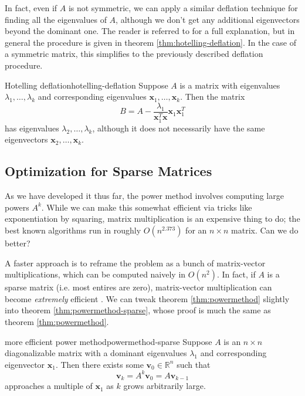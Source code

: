 \documentclass{article}
\let\vec\mathbf
\begin{document}
In fact, even if $A$ is not symmetric, we can apply a similar deflation technique for finding all the eigenvalues of $A$, although we don't get any additional eigenvectors beyond the dominant one. The reader is referred to \cite{deflation} for a full explanation, but in general the procedure is given in theorem \ref{thm:hotelling-deflation}. In the case of a symmetric matrix, this simplifies to the previously described deflation procedure.

\begin{theorem}{Hotelling deflation}{hotelling-deflation}
  Suppose $A$ is a matrix with eigenvalues $\lambda_1, \ldots, \lambda_k$ and corresponding eigenvalues $\vec{x}_1, \ldots, \vec{x}_k$. Then the matrix
  \begin{equation*}
    B = A - \frac{\lambda_1}{\vec{x}_1^T\vec{x}}\vec{x}_1\vec{x}_1^T
  \end{equation*}
  has eigenvalues $\lambda_2, \ldots, \lambda_k$, although it does not necessarily have the same eigenvectors $\vec{x}_2, \ldots, \vec{x}_k$.
\end{theorem}

\subsection{Optimization for Sparse Matrices}
As we have developed it thus far, the power method involves computing large powers $A^k$. While we can make this somewhat efficient via tricks like exponentiation by squaring, matrix multiplication is an expensive thing to do; the best known algorithms run in roughly $O(n^{2.373})$ \cite{matmul} for an $n \times n$ matrix. Can we do better?

A faster approach is to reframe the problem as a bunch of matrix-vector multiplications, which can be computed naively in $O(n^2)$. In fact, if $A$ is a sparse matrix (i.e. most entires are zero), matrix-vector multiplication can become \emph{extremely} efficient \cite{pwr-rot}. We can tweak theorem \ref{thm:powermethod} slightly into theorem \ref{thm:powermethod-sparse}, whose proof is much the same as theorem \ref{thm:powermethod}.

\begin{theorem}{more efficient power method}{powermethod-sparse}
  Suppose $A$ is an $n \times n$ diagonalizable matrix with a dominant eigenvalues $\lambda_1$ and corresponding eigenvector $\vec{x}_1$. Then there exists some $\vec{v}_0 \in \mathbb{R}^n$ such that
  \begin{equation*}
    \vec{v}_k = A^k\vec{v}_0 = A\vec{v}_{k-1}
  \end{equation*}
  approaches a multiple of $\vec{x}_1$ as $k$ grows arbitrarily large.
\end{theorem}
\end{document}
